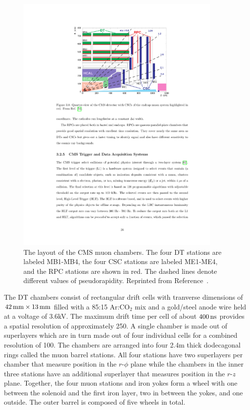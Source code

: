 \begin{figure}[htbp]
  \centering
  \includegraphics[width=0.9\textwidth]{Detector/Figures/cms_muons.pdf}
  \caption{
    The layout of the CMS muon chambers.
    The four DT stations are labeled MB1-MB4, the four CSC stations are labeled ME1-ME4, and the RPC stations are shown in red.
    The dashed lines denote different values of pseudorapidity.
    Reprinted from Reference~\cite{CMS2008}.
  }
  \label{fig:cms_muons}
\end{figure}

The DT chambers consist of rectangular drift cells with tranverse dimensions of $42\,\text{mm} \times 13\,\text{mm}$ filled with a 85:15 Ar:CO$_2$ mix and a gold/steel anode wire held at a voltage of 3.6\unit{kV}.
The maximum drift time per cell of about $400\, \text{ns}$ provides a spatial resolution of approximately 250\mum.
A single chamber is made out of superlayers which are in turn made out of four individual cells for a combined resolution of 100\mum.
The chambers are arranged into four 2.4\unit{m} thick dodecagonal rings called the muon barrel stations.
All four stations have two superlayers per chamber that measure position in the $r$-$\phi$ plane while the chambers in the inner three stations have an additional superlayer that measures position in the $r$-$z$ plane.
Together, the four muon stations and iron yokes form a wheel with one between the solenoid and the first iron layer, two in between the yokes, and one outside.
The outer barrel is composed of five wheels in total. 

